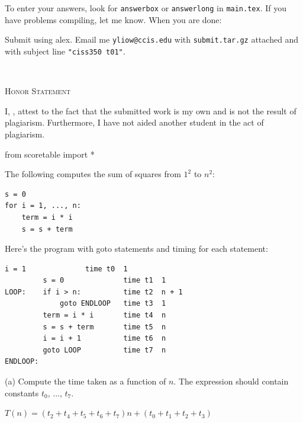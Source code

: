 



To enter your answers, look for \verb!answerbox! or \verb!answerlong!
in \verb!main.tex!.
If you have problems compiling, let me know.
When you are done:
\begin{enumerate}
  \li Submit using alex.
  \li Email me \verb!yliow@ccis.edu! with \verb!submit.tar.gz! attached and with
  subject line \verb!"ciss350 t01"!.
\end{enumerate}

\mbox{}\\

\begin{center}
  \textsc{Honor Statement}
\end{center}
I, ,
attest to the fact that the submitted work is my own and
is not the result of plagiarism.
Furthermore, I have not aided another student in the act of
plagiarism.



\begin{python}
from scoretable import *
\end{python}

\newpage


\newpage
\nextq %

The following computes the sum of squares from $1^2$ to $n^2$:
\begin{Verbatim}[frame=single]
s = 0
for i = 1, ..., n:
    term = i * i
    s = s + term
\end{Verbatim}
Here's the program with goto statements and timing for each statement:
\begin{Verbatim}[frame=single]
         i = 1              time t0  1
         s = 0              time t1  1
LOOP:    if i > n:          time t2  n + 1
             goto ENDLOOP   time t3  1
         term = i * i       time t4  n
         s = s + term       time t5  n
         i = i + 1          time t6  n
         goto LOOP          time t7  n
ENDLOOP:
\end{Verbatim}
(a) Compute the time taken as a function of $n$.
The expression should contain constants $t_0$, ..., $t_7$.
\\
\ANSWER
\begin{answerlong}
$T(n) = (t_2  + t_4 + t_5 + t_6 + t_7)n + (t_0 + t_1 + t_2 + t_3)$
\end{answerlong}

